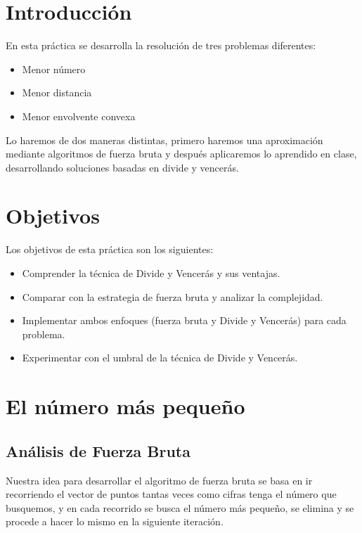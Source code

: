 \documentclass[a4paper,12pt]{article}
\begin{document}

\section{Introducción}
En esta práctica se desarrolla la resolución de tres problemas diferentes: 

\begin{itemize}
	\item Menor número
	\item Menor distancia
	\item Menor envolvente convexa
\end{itemize}

Lo haremos de dos maneras distintas, primero haremos una aproximación mediante algoritmos 
de fuerza bruta y después aplicaremos lo aprendido en clase, desarrollando soluciones basadas 
en divide y vencerás.


\section{Objetivos}
Los objetivos de esta práctica son los siguientes:
\begin{itemize}
	\item Comprender la técnica de Divide y Vencerás y sus ventajas.
	\item Comparar con la estrategia de fuerza bruta y analizar la complejidad.
	\item Implementar ambos enfoques (fuerza bruta y Divide y Vencerás) para cada problema.
	\item Experimentar con el umbral de la técnica de Divide y Vencerás.
\end{itemize}

\section{El número más pequeño}
\label{sec:El número más pequeño}
\subsection{Análisis de Fuerza Bruta}

Nuestra idea para desarrollar el algoritmo de fuerza bruta se basa en ir recorriendo el vector de puntos tantas veces como cifras tenga el número que busquemos, y en cada recorrido se busca el número más pequeño, se elimina y se procede a hacer lo mismo en la siguiente iteración.
\end{document}
